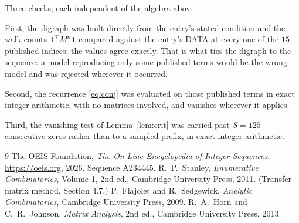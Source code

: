\documentclass[11pt,a4paper]{article}
\theoremstyle{plain}
\theoremstyle{definition}
\begin{document}
Three checks, each independent of the algebra above.

First, the digraph was built directly from the entry's stated condition and the walk counts
$\mathbf{1}^{\!\top}M^{n}\mathbf{1}$ compared against the entry's DATA at every one of
the $15$ published indices; the values agree exactly. That is what ties the digraph to
the sequence: a model reproducing only some published terms would be the wrong model and
was rejected wherever it occurred.

Second, the recurrence \eqref{eq:conj} was evaluated on those published terms in exact
integer arithmetic, with no matrices involved, and vanishes wherever it applies.

Third, the vanishing test of Lemma~\ref{lem:crit} was carried past $S=125$ consecutive
zeros rather than to a sampled prefix, in exact integer arithmetic.

\begin{thebibliography}{9}
 The OEIS Foundation, \emph{The On-Line Encyclopedia of Integer
Sequences}, \url{https://oeis.org}, 2026. Sequence A234445.
 R.~P.~Stanley, \emph{Enumerative Combinatorics}, Volume 1, 2nd ed.,
Cambridge University Press, 2011. (Transfer-matrix method, Section 4.7.)
 P.~Flajolet and R.~Sedgewick, \emph{Analytic Combinatorics}, Cambridge
University Press, 2009.
 R.~A.~Horn and C.~R.~Johnson, \emph{Matrix Analysis}, 2nd ed., Cambridge
University Press, 2013.
\end{thebibliography}
\end{document}
